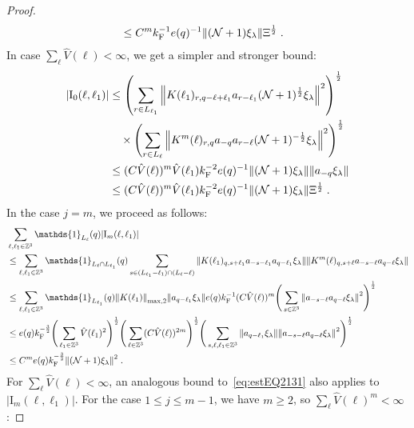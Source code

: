 \documentclass[12pt,a4paper]{article}
\numberwithin{equation}{section}
\newcommand{\1}{\mathbb{I}}
\newcommand{\F}{\mathrm{F}}
\newcommand{\I}{\mathrm{I}}
\newcommand{\Zstar}{\mathbb{Z}^3} %
\newcommand{\Z}{\mathbb{Z}}
\newcommand{\NN}{\mathcal{N}}
\newcommand{\half}{\frac{1}{2}}
\theoremstyle{plain}
\theoremstyle{definition}
\theoremstyle{remark}
\theoremstyle{plain}
\theoremstyle{definition}
\theoremstyle{remark}
\begin{document}
\begin{proof}
\begin{align}
	&\leq C^m k_{\F}^{-1} e(q)^{-1}
		\norm{ (\NN+1) \xi_\lambda} \Xi^{\half} \;. \label{eq:estEQ2131_Coulomb}
\end{align}
In case $ \sum_\ell \hat{V}(\ell) < \infty $, we get a simpler and stronger bound:
\begin{align}
	|\I_0(\ell, \ell_1)|
 	&\leq \left(\sum_{r\in L_{\ell_1}} \norm{ K(\ell_1)_{r,q-\ell+\ell_1} a_{r-\ell_1}(\NN+1)^{\half} \xi_\lambda}^2\right)^\half \nonumber\\
	& \quad \times \left(\sum_{r\in L_{\ell}} \norm{ K^m(\ell)_{r,q} a_{-q}a_{r-\ell} (\NN+1)^{-\half} \xi_\lambda }^2 \right)^\half \nonumber\\
	&\leq (C \hat{V}(\ell))^m \hat{V}(\ell_1) k_{\F}^{-2} e(q)^{-1} \norm{ (\NN+1) \xi_\lambda} \norm{ a_{-q} \xi_\lambda } \nonumber \\
	&\leq (C \hat{V}(\ell))^m
		\hat{V}(\ell_1)
		k_{\F}^{-2} e(q)^{-1}
		\norm{ (\NN+1) \xi_\lambda} \Xi^{\half} \;. \label{eq:estEQ2131}
\end{align}
In the case $ j = m $, we proceed as follows:
\begin{align}
	&\sum_{\ell,\ell_1 \in \Zstar} \mathds{1}_{L_\ell}(q) |\I_m(\ell, \ell_1)| \nonumber\\
	&\leq \sum_{\ell,\ell_1 \in \Zstar} \mathds{1}_{L_\ell \cap L_{\ell_1}}(q) \sum\limits_{s \in (L_{\ell_1} - \ell_1) \cap (L_\ell - \ell)}
		\norm{ K(\ell_1)_{q,s+\ell_1} a_{-s-\ell_1} a_{q-\ell_1} \xi_\lambda}
		\norm{ K^m(\ell)_{q,s+\ell} a_{-s-\ell} a_{q-\ell} \xi_\lambda } \nonumber\\
	&\leq \sum_{\ell,\ell_1 \in \Zstar} \mathds{1}_{L_{\ell_1}}(q) 
		\norm{K(\ell_1)}_{\max,2}
		\norm{  a_{q-\ell_1} \xi_\lambda}
		e(q) k_{\F}^{-1} (C \hat{V}(\ell))^m 
	\Bigg( \sum_{s\in \Z^3} \norm{a_{-s-\ell} a_{q-\ell} \xi_\lambda }^2 \Bigg)^{\half} \nonumber\\
	&\leq e(q) k_{\F}^{-\frac 32}
		\Bigg( \sum_{\ell_1 \in \Zstar} \hat{V}(\ell_1)^2 \Bigg)^{\half}
		\Bigg( \sum_{\ell \in \Zstar} (C \hat{V}(\ell))^{2m} \Bigg)^{\half}
		\Bigg( \sum_{s, \ell, \ell_1 \in \Z^3} \norm{ a_{q-\ell_1} \xi_\lambda}
		\norm{a_{-s-\ell} a_{q-\ell} \xi_\lambda }^2 \Bigg)^{\half} \nonumber\\
	&\leq C^m e(q) k_{\F}^{-\frac 32}
		\norm{(\NN+1) \xi_\lambda }^2
		\;. \label{eq:estEQ2131_Coulomb_bis}
\end{align}
For $ \sum_\ell \hat{V}(\ell) < \infty $, an analogous bound to~\eqref{eq:estEQ2131} also applies to $ |\I_m(\ell, \ell_1)| $. For the case $ 1 \le j \le m-1 $, we have $ m \ge 2 $, so $ \sum_\ell \hat{V}(\ell)^m < \infty $:

\end{proof}
\end{document}
